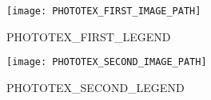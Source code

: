 \begin{minipage}[t][0.025\textheight][t]{\textwidth}
  \hfill\vfill
\end{minipage}
\begin{minipage}[t][0.45\textheight][t]{\textwidth}
  \begin{center}
    \texttt{[image: PHOTOTEX\_FIRST\_IMAGE\_PATH]}\\[1em]
  \end{center}
\end{minipage}
\begin{minipage}[t][0.03\textheight][t]{\textwidth}
  \begin{center}
    PHOTOTEX_FIRST_LEGEND\\[1em]
  \end{center}
\end{minipage}
\begin{minipage}[t][0.45\textheight][t]{\textwidth}
  \begin{center}
    \texttt{[image: PHOTOTEX\_SECOND\_IMAGE\_PATH]}\\[1em]
  \end{center}
\end{minipage}
\begin{minipage}[t][0.03\textheight][t]{\textwidth}
  \begin{center}
    PHOTOTEX_SECOND_LEGEND\\[1em]
  \end{center}
\end{minipage}

